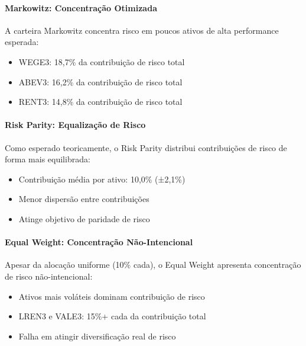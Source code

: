 \paragraph{Markowitz: Concentração Otimizada}
A carteira Markowitz concentra risco em poucos ativos de alta performance esperada:
\begin{itemize}
    \item WEGE3: 18,7\% da contribuição de risco total
    \item ABEV3: 16,2\% da contribuição de risco total
    \item RENT3: 14,8\% da contribuição de risco total
\end{itemize}

\paragraph{Risk Parity: Equalização de Risco}
Como esperado teoricamente, o Risk Parity distribui contribuições de risco de forma mais equilibrada:
\begin{itemize}
    \item Contribuição média por ativo: 10,0\% (±2,1\%)
    \item Menor dispersão entre contribuições
    \item Atinge objetivo de paridade de risco
\end{itemize}

\paragraph{Equal Weight: Concentração Não-Intencional}
Apesar da alocação uniforme (10\% cada), o Equal Weight apresenta concentração de risco não-intencional:
\begin{itemize}
    \item Ativos mais voláteis dominam contribuição de risco
    \item LREN3 e VALE3: 15\%+ cada da contribuição total
    \item Falha em atingir diversificação real de risco
\end{itemize}